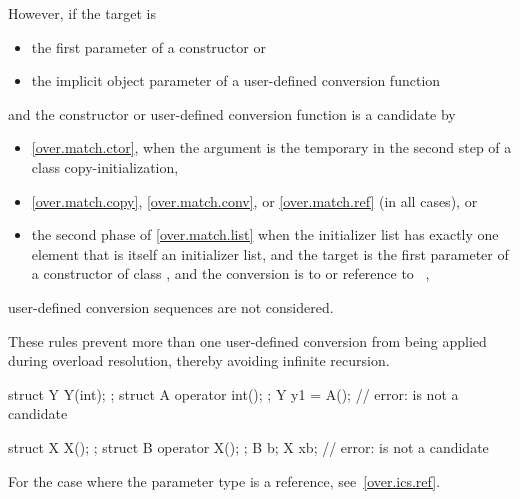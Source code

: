 \pnum
However, if the target is
\begin{itemize}
\item the first parameter of a constructor or
\item the implicit object parameter of a user-defined conversion function
\end{itemize}
and the constructor or user-defined conversion function is a candidate by
\begin{itemize}
\item \ref{over.match.ctor}, when the argument is the temporary in the second
step of a class copy-initialization,
\item \ref{over.match.copy}, \ref{over.match.conv}, or \ref{over.match.ref}
(in all cases), or
\item the second phase of \ref{over.match.list}
when the initializer list has exactly one element that
is itself an initializer list, and
the target is the first parameter of a constructor of class , and
the conversion is to  or reference to \cv{}~,
\end{itemize}
user-defined conversion sequences are not considered.
\begin{note}
These rules prevent more than one user-defined conversion from being
applied during overload resolution, thereby avoiding infinite recursion.
\end{note}
\begin{example}
\begin{codeblock}
struct Y { Y(int); };
struct A { operator int(); };
Y y1 = A();         // error:  is not a candidate

struct X { X(); };
struct B { operator X(); };
B b;
X x{{b}};           // error:  is not a candidate
\end{codeblock}
\end{example}

\pnum
For the case where the parameter type is a reference, see~\ref{over.ics.ref}.

